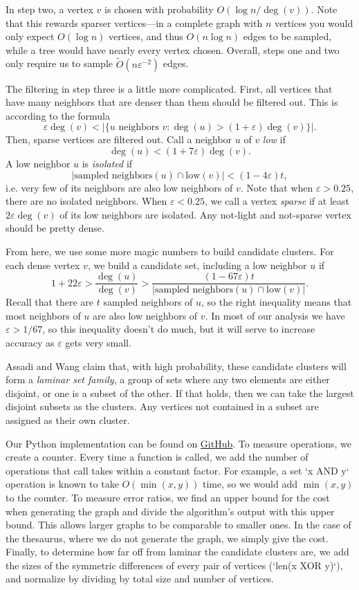 \documentclass[
]{article}
\begin{document}
In step two, a vertex {\(v\)} is chosen with probability
  {\(O(\log n/\deg(v))\)}. Note that this rewards sparser vertices---in a
complete graph with {\(n\)} vertices you would only expect
  {\(O(\log n)\)} vertices, and thus {\(O(n\log n)\)} edges to be sampled,
while a tree would have nearly every vertex chosen. Overall, steps one
and two only require us to sample
  {\(\tilde{O}(n\varepsilon^{- 2})\)} edges.

The filtering in step three is a little more complicated. First, all
vertices that have many neighbors that are denser than them should be filtered out. This is
according to the formula
  {\[\varepsilon\deg(v) < |\{ u\text{~neighbors~}v:\deg(u) > (1 + \varepsilon)\deg(v)\}|.\]}Then, sparse vertices are filtered out.
Call a neighbor $u$ of $v$ \emph{low} if
  {\[\deg(u) < (1 + 7\varepsilon)\deg(v).\]}A low neighbor {\(u\)} is
\emph{isolated} if
  {\[|\text{sampled\ neighbors}(u) \cap \text{low}(v)| < (1 - 4\varepsilon)t,\]}i.e.
very few of its neighbors are also low neighbors of {\(v\)}. Note that when $\varepsilon > 0.25$, there are no isolated neighbors. When $\varepsilon < 0.25$, we call a vertex \emph{sparse} if at least {\(2\varepsilon\deg(v)\)} of its low neighbors are isolated. Any not-light and not-sparse vertex should be pretty dense.

From here, we use some more magic numbers to build candidate clusters.
For each dense vertex {\(v\)}, we build a candidate set, including a low
neighbor {\(u\)} if
  {\[1 + 22\varepsilon > \frac{\deg(u)}{\deg(v)} > \frac{(1 - 67\varepsilon)t}{|\text{sampled\ neighbors}(u) \cap \text{low}(v)|}.\]}Recall
that there are {\(t\)} sampled neighbors of {\(u\)}, so the right
inequality means that most neighbors of {\(u\)} are also low neighbors
of {\(v\)}. In most of our analysis we have {\(\varepsilon > 1/67\)}, so
this inequality doesn't do much, but it will serve to
increase accuracy as {\(\varepsilon\)} gets very small.

Assadi and Wang claim that, with high probability, these candidate clusters will form a
\emph{laminar set family}, a group of sets where any two elements are either disjoint,
or one is a subset of the other.
If that holds, then we can take the largest disjoint subsets as the clusters.
Any vertices not contained in a subset are assigned as their own cluster.

Our Python implementation can be found on \href{https://github.com/cooljoseph1/Clustering-Algorithm-Implementation}{GitHub}. To measure operations, we create a counter. Every time a function is called, we add the number of operations that call takes within a constant factor. For example, a set `x AND y` operation is known to take $O(\min(x, y))$ time, so we would add $\min(x, y)$ to the counter. To measure error ratios, we find an upper bound for the cost when generating the graph and divide the algorithm's output with this upper bound. This allows larger graphs to be comparable to smaller ones. In the case of the thesaurus, where we do not generate the graph, we simply give the cost. Finally, to determine how far off from laminar the candidate clusters are, we add the sizes of the symmetric differences of every pair of vertices (`len(x XOR y)`), and normalize by dividing by total size and number of vertices.
\end{document}
